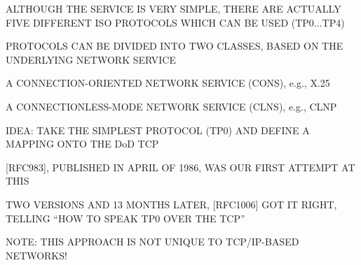 \begin{bwslide}

\begin{nrtc}
\item	ALTHOUGH THE SERVICE IS VERY SIMPLE, THERE ARE ACTUALLY FIVE DIFFERENT
	ISO PROTOCOLS WHICH CAN BE USED (TP0$\ldots$TP4)

\item	PROTOCOLS CAN BE DIVIDED INTO TWO CLASSES, BASED ON THE UNDERLYING
	NETWORK SERVICE
    \begin{nrtc}
    \item	A CONNECTION-ORIENTED NETWORK SERVICE (CONS), e.g., X.25

    \item	A CONNECTIONLESS-MODE NETWORK SERVICE (CLNS), e.g., CLNP
    \end{nrtc}
\end{nrtc}
\end{bwslide}


\begin{bwslide}

\begin{nrtc}
\item	IDEA: TAKE THE SIMPLEST PROTOCOL (TP0) AND DEFINE A MAPPING ONTO
	THE DoD TCP

\item{}	[RFC983], PUBLISHED IN APRIL OF 1986, WAS OUR FIRST ATTEMPT AT THIS

\item	TWO VERSIONS AND 13 MONTHS LATER, [RFC1006] GOT IT RIGHT, TELLING
	``HOW TO SPEAK TP0 OVER THE TCP''

\item	NOTE: THIS APPROACH IS NOT UNIQUE TO TCP/IP-BASED NETWORKS!
\end{nrtc}
\end{bwslide}





